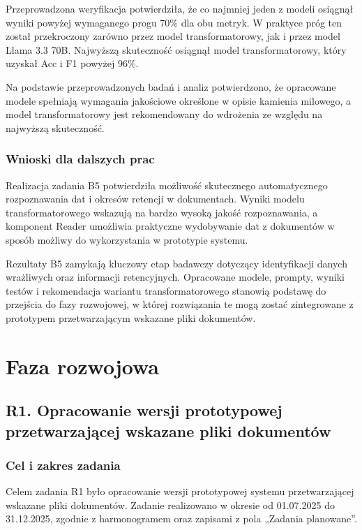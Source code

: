 \documentclass[12pt,a4paper]{report}
\begin{document}
Przeprowadzona weryfikacja potwierdziła, że co najmniej jeden z modeli osiągnął wyniki powyżej wymaganego progu 70\% dla obu metryk. W praktyce próg ten został przekroczony zarówno przez model transformatorowy, jak i przez model Llama 3.3 70B. Najwyższą skuteczność osiągnął model transformatorowy, który uzyskał Acc i F1 powyżej 96\%.

Na podstawie przeprowadzonych badań i analiz potwierdzono, że opracowane modele spełniają wymagania jakościowe określone w opisie kamienia milowego, a model transformatorowy jest rekomendowany do wdrożenia ze względu na najwyższą skuteczność.

\subsection{Wnioski dla dalszych prac}
Realizacja zadania B5 potwierdziła możliwość skutecznego automatycznego rozpoznawania dat i okresów retencji w dokumentach. Wyniki modelu transformatorowego wskazują na bardzo wysoką jakość rozpoznawania, a komponent Reader umożliwia praktyczne wydobywanie dat z dokumentów w sposób możliwy do wykorzystania w prototypie systemu.

Rezultaty B5 zamykają kluczowy etap badawczy dotyczący identyfikacji danych wrażliwych oraz informacji retencyjnych. Opracowane modele, prompty, wyniki testów i rekomendacja wariantu transformatorowego stanowią podstawę do przejścia do fazy rozwojowej, w której rozwiązania te mogą zostać zintegrowane z prototypem przetwarzającym wskazane pliki dokumentów.


\chapter{Faza rozwojowa}



\section{R1. Opracowanie wersji prototypowej przetwarzającej wskazane pliki dokumentów}
\subsection{Cel i zakres zadania}
Celem zadania R1 było opracowanie wersji prototypowej systemu przetwarzającej wskazane pliki dokumentów. Zadanie realizowano w okresie od 01.07.2025 do 31.12.2025, zgodnie z harmonogramem oraz zapisami z pola „Zadania planowane”.
\end{document}
